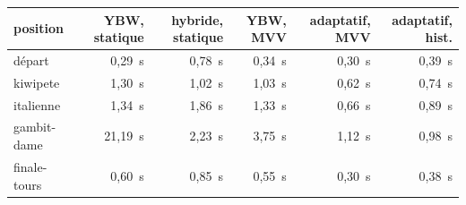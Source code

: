 \begin{tabular}{lrrrrr}\toprule position & YBW, statique & hybride, statique & YBW, MVV & adaptatif, MVV & adaptatif, hist.\\\midrule
départ & 0{,}29~s & 0{,}78~s & 0{,}34~s & 0{,}30~s & 0{,}39~s\\
kiwipete & 1{,}30~s & 1{,}02~s & 1{,}03~s & 0{,}62~s & 0{,}74~s\\
italienne & 1{,}34~s & 1{,}86~s & 1{,}33~s & 0{,}66~s & 0{,}89~s\\
gambit-dame & 21{,}19~s & 2{,}23~s & 3{,}75~s & 1{,}12~s & 0{,}98~s\\
finale-tours & 0{,}60~s & 0{,}85~s & 0{,}55~s & 0{,}30~s & 0{,}38~s\\\bottomrule\end{tabular}
